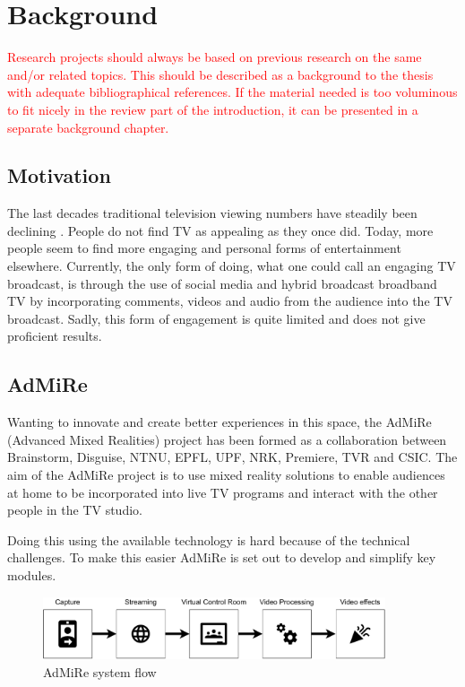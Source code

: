 \chapter{Background}\label{cha:background}
%
\textcolor{red}{Research projects should always be based on previous research on the same and/or related topics. This should be described as a background to the thesis with adequate bibliographical references. If the material needed is too voluminous to fit nicely in the review part of the introduction, it can be presented in a separate background chapter.}


\section{Motivation}\label{sec:motivation}

The last decades traditional television viewing numbers have steadily been declining \cite{ssb_seertall}. People do not find TV as appealing as they once did. Today, more people seem to find more engaging and personal forms of entertainment elsewhere. Currently, the only form of doing, what one could call an engaging TV broadcast, is through the use of social media and hybrid broadcast broadband TV by incorporating comments, videos and audio from the audience into the TV broadcast. Sadly, this form of engagement is quite limited and does not give proficient results. 

\section{AdMiRe}\label{sec:admire}
Wanting to innovate and create better experiences in this space, the AdMiRe \cite{admire} (Advanced Mixed Realities) project has been formed as a collaboration between Brainstorm, Disguise, NTNU, EPFL, UPF, NRK, Premiere, TVR and CSIC. The aim of the AdMiRe project is to use mixed reality solutions to enable audiences at home to be incorporated into live TV programs and interact with the other people in the TV studio. 

Doing this using the available technology is hard because of the technical challenges. To make this easier AdMiRe is set out to develop and simplify key modules. 

\begin{figure}[H]
  \centering
  \includegraphics[width=0.9\textwidth]{img/admire_system.pdf}
  \caption{AdMiRe system flow}
  \label{fig:admire_system}
\end{figure}


